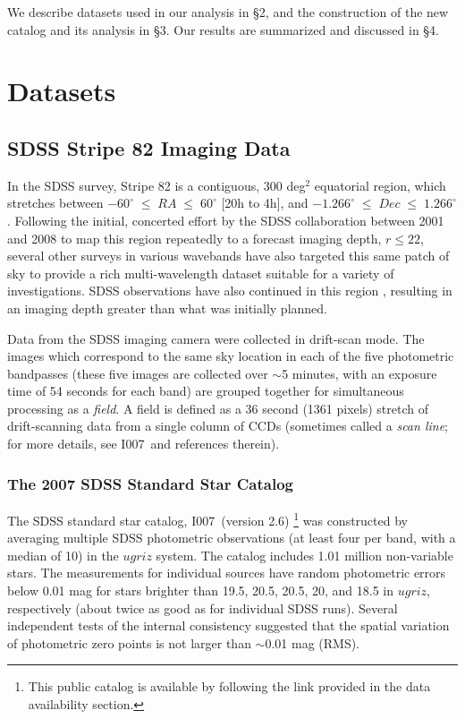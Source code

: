 \documentclass[fleqn,usenatbib]{mnras}
\newcommand{\pO}{\hbox{I007}}
\begin{document}
We describe datasets used in our analysis in \S2, and the construction of the new catalog and its analysis in \S3. 
Our results are summarized and discussed in \S4. 


\section{Datasets} \label{sec:data}

\subsection{SDSS Stripe 82 Imaging Data} \label{ssec:s82}

In the SDSS survey, Stripe 82 is a contiguous, 300 deg$^2$ equatorial region, which stretches between $-60^{\circ}\;\leq\;RA\;\leq\;60^{\circ}$ [20h to 4h], and $-1.266^{\circ}\;\leq\;Dec\;\leq\;1.266^{\circ}$. Following the initial, concerted effort by the SDSS collaboration between 2001 and 2008 to map this region repeatedly to a forecast imaging depth, $r \leq 22$, several other surveys in various wavebands have also targeted this same patch of sky to provide a rich multi-wavelength dataset suitable for a variety of investigations. SDSS observations have also continued in this region \citep[e.g., the SDSS-II search for supernovae,][]{2008AJ....135..338F}, resulting in an imaging depth greater than what was initially planned.  

Data from the SDSS imaging camera \citep{1998AJ....116.3040G} were collected in drift-scan mode. The images which correspond to the same sky location in each of the five photometric bandpasses (these five images are collected over $\sim$5 minutes, with an exposure time of 54 seconds for each band) are grouped together for simultaneous processing as a {\it field}. A field is defined as a 36 second (1361 pixels)  stretch of drift-scanning data from a single column of CCDs (sometimes called a {\it scan line}; for more details, see \pO\ and references therein). 

\subsubsection{The 2007 SDSS Standard Star Catalog}

The SDSS standard star catalog, \pO\ (version 2.6) \footnote{This public catalog is available by following the link provided in the data availability section.} was constructed by averaging multiple SDSS photometric observations (at least four per band, with a median of 10) in the $ugriz$ system. The catalog includes 1.01 million non-variable stars. The measurements for individual sources have random photometric errors below 0.01 mag for stars brighter than 19.5, 20.5, 20.5, 20, and 18.5 in $ugriz$, respectively (about twice as good as for individual SDSS runs). Several independent tests of the internal consistency suggested that the spatial variation of photometric zero points is not larger than $\sim$0.01 mag (RMS).  
\end{document}
